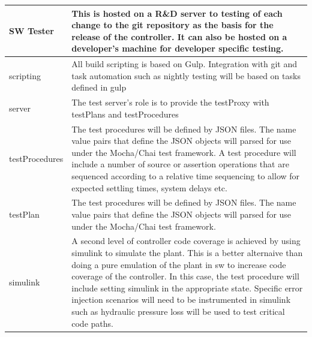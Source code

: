 \documentclass[11pt,english,twoside]{extarticle}
\begin{document}
\begin{tabular}{|p{2.5cm}|p{12cm}|} \hline 
SW Tester & This is hosted on a R\&D server to testing of each change to the git repository as the basis for the release of the controller. It can also be hosted on a developer's machine for developer specific testing. \\ \hline
scripting & All build scripting is based on Gulp. Integration with git and task automation such as nightly testing will be based on tasks defined in gulp\\ \hline
server & The test server's role is to provide the testProxy with testPlans and testProcedures\\ \hline
 testProcedures & The test procedures will be defined by JSON files. The name value pairs that define the JSON objects will parsed for use under the Mocha/Chai test framework. A test procedure will include a number of source or assertion operations that are sequenced according to a relative time sequencing to allow for expected settling times, system delays etc. \\ \hline
 testPlan & The test procedures will be defined by JSON files. The name value pairs that define the JSON objects will parsed for use under the Mocha/Chai test framework. \\ \hline
simulink & A second level of controller code coverage is achieved by using simulink to simulate the plant.  This is a better alternaive than doing a pure emulation of the plant in sw to increase code coverage of the controller. In this case, the test procedure will include setting simulink in the appropriate state. Specific error injection scenarios will need to be instrumented in simulink such as hydraulic pressure loss will be used to test critical code paths.\\ \hline
\end{tabular}

 


\label{lastpage}
\end{document}
